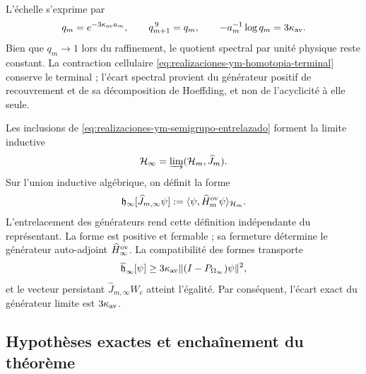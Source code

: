 L'échelle s'exprime par
\begin{equation}\label{eq:realizaciones-ym-qm}
 q_m=e^{-3\kappa_{\rm av}a_m},
 \qquad q_{m+1}^{\,9}=q_m,
 \qquad -a_m^{-1}\log q_m=3\kappa_{\rm av}.
\end{equation}
Bien que \(q_m\to1\) lors du raffinement, le quotient spectral par unité physique reste constant. La contraction cellulaire \eqref{eq:realizaciones-ym-homotopia-terminal} conserve le terminal ; l'écart spectral provient du générateur positif de recouvrement et de sa décomposition de Hoeffding, et non de l'acyclicité à elle seule.

Les inclusions de \eqref{eq:realizaciones-ym-semigrupo-entrelazado}
forment la limite inductive
\begin{equation}\label{eq:realizaciones-ym-colimite}
 \mathcal H_\infty=\varinjlim(\mathcal H_m,\widehat J_m).
\end{equation}
Sur l’union inductive algébrique, on définit la forme
\begin{equation}\label{eq:realizaciones-ym-forma-limite}
 \mathfrak h_\infty[\widehat J_{m,\infty}\psi]
 :=\langle\psi,\widehat H_m^{\rm ov}\psi\rangle_{\mathcal H_m}.
\end{equation}
L’entrelacement des générateurs rend cette définition
indépendante du représentant. La forme est positive et fermable ; sa
fermeture détermine le générateur auto-adjoint \(\widehat H_\infty^{\rm ov}\).
La compatibilité des formes transporte
\begin{equation}\label{eq:realizaciones-ym-gap-forma-limite}
 \overline{\mathfrak h}_\infty[\psi]
 \geq3\kappa_{\rm av}
 \|(I-P_{\Omega_\infty})\psi\|^2,
\end{equation}
et le vecteur persistant
\(\widehat J_{m,\infty}W_c\) atteint l’égalité. Par conséquent,
l’écart exact du générateur limite est \(3\kappa_{\rm av}\).

\subsection*{Hypothèses exactes et enchaînement du théorème}


